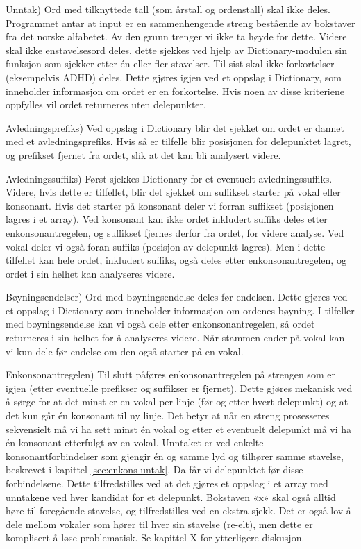 \begin{inparadesc}
\item[Unntak)] Ord med tilknyttede tall (som årstall og ordenstall) skal ikke deles. Programmet antar at input er en sammenhengende streng bestående av bokstaver fra det norske alfabetet. Av den grunn trenger vi ikke ta høyde for dette. Videre skal ikke enstavelsesord deles, dette sjekkes ved hjelp av Dictionary-modulen sin funksjon som sjekker etter én eller fler stavelser. Til sist skal ikke forkortelser (eksempelvis ADHD) deles. Dette gjøres igjen ved et oppslag i Dictionary, som inneholder informasjon om ordet er en forkortelse. Hvis noen av disse kriteriene oppfylles vil ordet returneres uten delepunkter.
\item[Avledningsprefiks)] Ved oppslag i Dictionary blir det sjekket om ordet er dannet med et avledningsprefiks. Hvis så er tilfelle blir posisjonen for delepunktet lagret, og prefikset fjernet fra ordet, slik at det kan bli analysert videre.
\item[Avledningssuffiks)] Først sjekkes Dictionary for et eventuelt avledningssuffiks. Videre, hvis dette er tilfellet, blir det sjekket om suffikset starter på vokal eller konsonant. Hvis det starter på konsonant deler vi forran suffikset (posisjonen lagres i et array). Ved konsonant kan ikke ordet inkludert suffiks deles etter enkonsonantregelen, og suffikset fjernes derfor fra ordet, for videre analyse. Ved vokal deler vi også foran suffiks (posisjon av delepunkt lagres). Men i dette tilfellet kan hele ordet, inkludert suffiks, også deles etter enkonsonantregelen, og ordet i sin helhet kan analyseres videre.
\item[Bøyningsendelser)] Ord med bøyningsendelse deles før endelsen. Dette gjøres ved et oppslag i Dictionary som inneholder informasjon om ordenes bøyning. I tilfeller med bøyningsendelse kan vi også dele etter enkonsonantregelen, så ordet returneres i sin helhet for å analyseres videre. Når stammen ender på vokal kan vi kun dele før endelse om den også starter på en vokal.
\item[Enkonsonantregelen)] Til slutt påføres enkonsonantregelen på strengen som er igjen (etter eventuelle prefikser og suffikser er fjernet). Dette gjøres mekanisk ved å sørge for at det minst er en vokal per linje (før og etter hvert delepunkt) og at det kun går én konsonant til ny linje. Det betyr at når en streng prosesseres sekvensielt må vi ha sett minst én vokal og etter et eventuelt delepunkt må vi ha én konsonant etterfulgt av en vokal. Unntaket er ved enkelte konsonantforbindelser som gjengir én og samme lyd og tilhører samme stavelse, beskrevet i kapittel \ref{sec:enkons-untak}. Da får vi delepunktet før disse forbindelsene. Dette tilfredstilles ved at det gjøres et oppslag i et array med unntakene ved hver kandidat for et delepunkt. Bokstaven «x» skal også alltid høre til foregående stavelse, og tilfredstilles ved en ekstra sjekk. Det er også lov å dele mellom vokaler som hører til hver sin stavelse (re-elt), men dette er komplisert å løse problematisk. Se kapittel X for ytterligere diskusjon.
\end{inparadesc}

